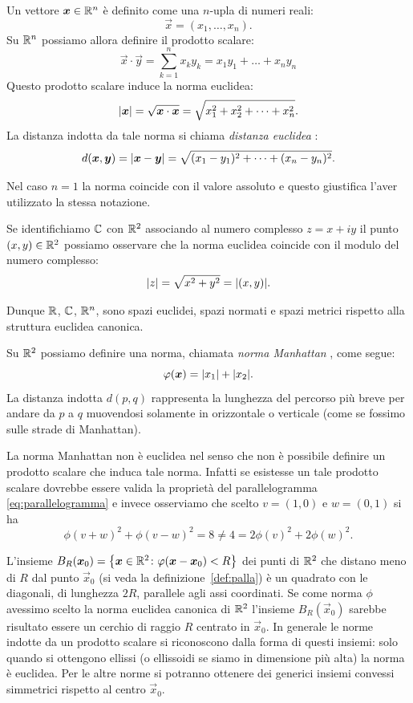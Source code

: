 \begin{definition}%
\label{def:124124}%
\mymark{*}%
Un vettore $\boldsymbol x\in {\mathbb R}^n$ è definito come una $n$-upla di numeri reali:
\[
  \vec x = (x_1, \dots, x_n).
\]
Su ${\mathbb R}^n$ possiamo allora definire il prodotto scalare:
\[
  \vec x\cdot \vec y
   = \sum_{k=1}^n x_k y_k
   = x_1 y_1 + \dots + x_n y_n
\]
Questo prodotto scalare induce la norma euclidea:
%
\[
  {\left|\boldsymbol x\right|} = \sqrt{\boldsymbol x \cdot \boldsymbol x}
  = \sqrt{x_1^2 + x_2^2+ \dots + x_n^2}.
\]
La distanza indotta da tale norma si chiama \emph{distanza euclidea}%
%
:
\[
  d(\boldsymbol x, \boldsymbol y)
  = {\left|\boldsymbol x-\boldsymbol y\right|}
  = \sqrt{(x_1-y_1)^2 + \dots + (x_n-y_n)^2}.
\]

Nel caso $n=1$ la norma coincide con il valore assoluto e questo
giustifica l'aver utilizzato la stessa notazione.

Se identifichiamo ${\mathbb C}$ con ${\mathbb R}^2$ associando al numero complesso $z=x+iy$
il punto $(x,y)\in {\mathbb R}^2$ possiamo osservare che la norma euclidea
coincide con il modulo del numero complesso:
\[
  {\left|z\right|} = \sqrt{x^2 + y^2} = {\left|(x,y)\right|}.
\]

Dunque ${\mathbb R}$, ${\mathbb C}$, ${\mathbb R}^n$,
sono spazi euclidei, spazi normati e spazi metrici rispetto alla struttura
euclidea canonica.
\end{definition}

\begin{example}
Su ${\mathbb R}^2$ possiamo definire una norma, chiamata \emph{norma Manhattan}%
%
,
come segue:
\[
  \varphi(\boldsymbol x) = {\left|x_1\right|} + {\left|x_2\right|}.
\]
La distanza indotta $d(p,q)$
%
%
rappresenta la lunghezza del percorso più breve per
andare da $p$ a $q$ muovendosi solamente in orizzontale o verticale
(come se fossimo sulle strade di Manhattan).

La norma Manhattan non è euclidea nel senso che non è possibile definire
un prodotto scalare che induca tale norma. Infatti se esistesse un
tale prodotto scalare dovrebbe essere valida la proprietà del parallelogramma
\eqref{eq:parallelogramma} e invece osserviamo che scelto $v=(1,0)$ e $w=(0,1)$
si ha
\[
  \phi(v+w)^2 + \phi(v-w)^2
  = 8
  \neq 4
  = 2\phi(v)^2 + 2\phi(w)^2.
\]

L'insieme $B_R(\boldsymbol x_0) = {\left\{ \boldsymbol x \in {\mathbb R}^2\colon \varphi(\boldsymbol x-\boldsymbol x_0) < R \right\}}$
dei punti di ${\mathbb R}^2$ che distano meno di $R$ dal  punto $\vec x_0$
(si veda la definizione~\ref{def:palla})
è un quadrato
con le diagonali, di lunghezza $2R$, parallele agli assi coordinati.
Se come norma $\phi$ avessimo scelto la norma euclidea canonica di ${\mathbb R}^2$
l'insieme $B_R(\vec x_0)$ sarebbe risultato essere un cerchio di raggio $R$
centrato in $\vec x_0$.
In generale le norme indotte da un prodotto scalare si riconoscono
dalla forma di questi insiemi: solo quando si ottengono ellissi
(o ellissoidi se siamo in dimensione più alta) la norma è euclidea.
Per le altre norme si potranno ottenere dei generici insiemi convessi simmetrici
rispetto al centro $\vec x_0$.
\end{example}

